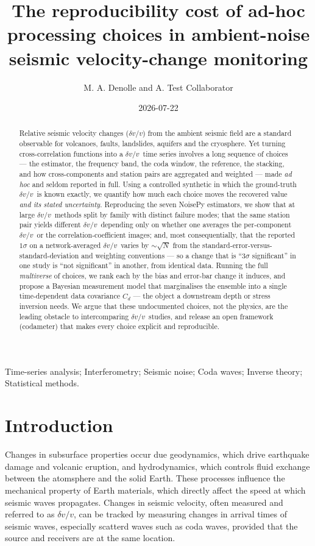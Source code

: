 \documentclass[
  referee]{gji}
\title{The reproducibility cost of ad-hoc processing choices in
ambient-noise seismic velocity-change monitoring}
\author{M. A. Denolle and A. Test Collaborator}
\date{2026-07-22}
\providecommand{\dvv}{\ensuremath{\delta v/v}}
\begin{document}
\maketitle
\begin{abstract}
Relative seismic velocity changes (\dvv) from the ambient seismic field
are a standard observable for volcanoes, faults, landslides, aquifers
and the cryosphere. Yet turning cross-correlation functions into a
\dvv~time series involves a long sequence of choices --- the estimator,
the frequency band, the coda window, the reference, the stacking, and
how cross-components and station pairs are aggregated and weighted ---
made \emph{ad hoc} and seldom reported in full. Using a controlled
synthetic in which the ground-truth \dvv~is known exactly, we quantify
how much each choice moves the recovered value \emph{and its stated
uncertainty}. Reproducing the seven NoisePy estimators, we show that at
large \dvv~methods split by family with distinct failure modes; that the
same station pair yields different \dvv~depending only on whether one
averages the per-component \dvv~or the correlation-coefficient images;
and, most consequentially, that the reported \(1\sigma\) on a
network-averaged \dvv~varies by \(\sim\!\sqrt{N}\) from the
standard-error-versus-standard-deviation and weighting conventions ---
so a change that is ``\(3\sigma\) significant'' in one study is ``not
significant'' in another, from identical data. Running the full
\emph{multiverse} of choices, we rank each by the bias and error-bar
change it induces, and propose a Bayesian measurement model that
marginalises the ensemble into a single time-dependent data covariance
\(C_d\) --- the object a downstream depth or stress inversion needs. We
argue that these undocumented choices, not the physics, are the leading
obstacle to intercomparing \dvv~studies, and release an open framework
(codameter) that makes every choice explicit and reproducible.
\end{abstract}


\begin{keywords}
Time-series analysis; Interferometry; Seismic noise; Coda waves; Inverse theory; Statistical methods.
\end{keywords}

\section{Introduction}\label{sec:intro}

Changes in subsurface properties occur due geodynamics, which drive
earthquake damage and volcanic eruption, and hydrodynamics, which
controls fluid exchange between the atomsphere and the solid Earth.
These processes influence the mechanical property of Earth materials,
which directly affect the speed at which seismic waves propagates.
Changes in seismic velocity, often measured and referred to as \dvv, can
be tracked by measuring changes in arrival times of seismic waves,
especially scatterd waves such as coda waves, provided that the source
and receivers are at the same location.
\end{document}
